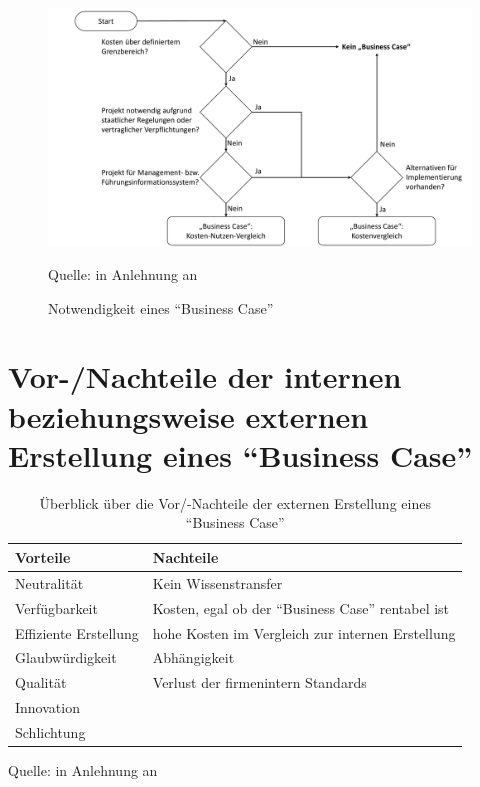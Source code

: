 \begin{figure}[H]
	\centering
	\includegraphics[scale=0.48]{img/entscheidungBC.pdf}
	\caption{Notwendigkeit eines \enquote{Business Case}}
	{\footnotesize Quelle: in Anlehnung an \cite[][S.29]{brugger_it_2009}}
	\label{abb:entscheidungBC}
\end{figure}

\section{Vor-/Nachteile der internen beziehungsweise externen Erstellung eines \enquote{Business Case}}\label{appendixVorNachteileErstellungBC}

\begin{table}[h!]
	\centering
	
	\begin{tabular}{@{}ll@{}}\toprule[1.5pt]
		
		\textbf{Vorteile} & \textbf{Nachteile} \\ \midrule
		
		Neutralität & Kein Wissenstransfer \\
		Verfügbarkeit & Kosten, egal ob der \enquote{Business Case} rentabel ist\\
		Effiziente Erstellung & hohe Kosten im Vergleich zur internen Erstellung \\
		Glaubwürdigkeit & Abhängigkeit \\
		Qualität & Verlust der firmenintern Standards \\
		Innovation & \\
		Schlichtung & \\
		
		\bottomrule[1.5pt]
	\end{tabular}
	
	\caption{Überblick über die Vor/-Nachteile der externen Erstellung eines \enquote{Business Case}}
	{\footnotesize Quelle: in Anlehnung an \cite[][S.34]{brugger_it_2009}}
	\label{tab:externVorNachteile}
	
\end{table}

